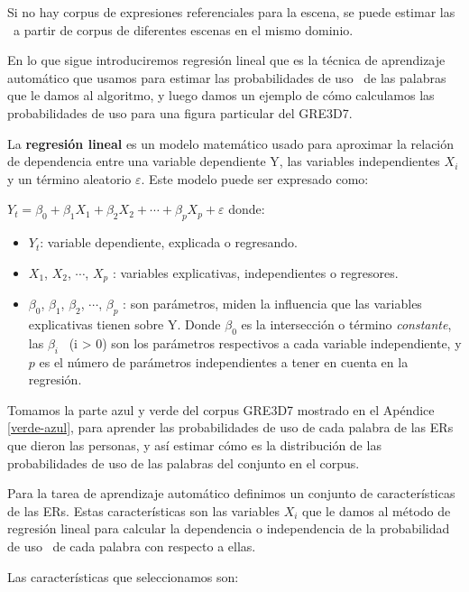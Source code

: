 Si no hay corpus de expresiones referenciales para la escena, se puede estimar las \puse~a partir de corpus de
diferentes escenas en el mismo dominio.

En lo que sigue introduciremos regresi\'on lineal que es la t\'ecnica de aprendizaje autom\'atico que usamos para estimar las probabilidades de uso \puse\ de las palabras que le damos al algoritmo, y luego damos un ejemplo de c\'omo calculamos las probabilidades de uso para una figura particular del GRE3D7.

La \textbf{regresi\'on lineal} es un modelo matem\'atico usado para aproximar la relaci\'on de dependencia entre una variable dependiente Y, las variables independientes $X_i$ y un t\'ermino aleatorio $\varepsilon$. Este modelo puede ser expresado como:

    $Y_t = \beta_0 + \beta_1 X_1 + \beta_2 X_2 + \cdots +\beta_p X_p + \varepsilon$ donde:
\begin{itemize}
    \item $Y_t$: variable dependiente, explicada o regresando.
    \item $X_1$, $X_2$, $\cdots$, $X_p$ : variables explicativas, independientes o regresores.
    \item $\beta_0$, $\beta_1$, $\beta_2$, $\cdots$, $\beta_p$ : son par\'ametros, miden la influencia que las variables explicativas tienen sobre Y. Donde $\beta_0$ es la intersecci\'on o t\'ermino {\it constante}, las $\beta_i$ \ (i > 0) son los par\'ametros respectivos a cada variable independiente, y $p$ es el n\'umero de par\'ametros independientes a tener en cuenta en la regresi\'on.
\end{itemize}

Tomamos la parte azul y verde del corpus GRE3D7 mostrado en el Ap\'endice \ref{verde-azul}, para aprender las probabilidades de uso de cada palabra de las ERs que dieron las personas, y as\'i estimar c\'omo es la distribuci\'on de las probabilidades de uso de las palabras del conjunto \REL en el corpus.

Para la tarea de aprendizaje autom\'atico definimos un conjunto de caracter\'isticas de las ERs. Estas caracter\'isticas son las variables $X_i$ que le damos al m\'etodo de regresi\'on lineal para calcular la dependencia o independencia de la probabilidad de uso \puse\ de cada palabra con respecto a ellas.

Las caracter\'isticas que seleccionamos son:

